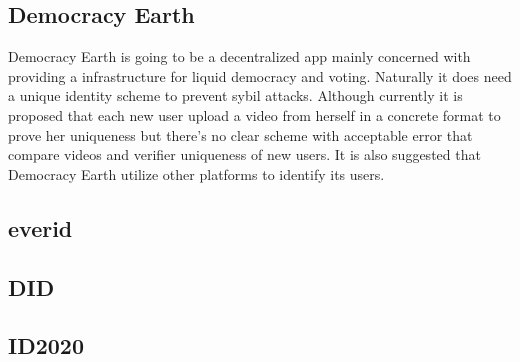 \documentclass{article}
\begin{document}
\subsection{Democracy Earth}
Democracy Earth is going to be a decentralized app mainly concerned with providing a infrastructure for liquid democracy and voting. Naturally it does need a unique identity scheme to prevent sybil attacks. Although currently it is proposed that each new user upload a video from herself in a concrete format to prove her uniqueness but there’s no clear scheme with acceptable error that compare videos and verifier uniqueness of new users. It is also suggested that Democracy Earth utilize other platforms to identify its users.
\subsection{everid}
\subsection{ DID}
\subsection{ID2020}
\end{document}

